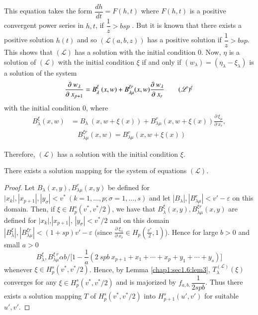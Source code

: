 This equation takes the form $\dfrac{dh}{dt} = F(h, t)$ where $F(h,
t)$ is a positive convergent power series in $h, t$,  if $\dfrac{1}{z}
> bsp$ . But it is known that there exists a positive solution $h(t)$
and so $(\mathscr{L}(a, b, z))$ has a positive solution if
$\dfrac{1}{z} >bsp$. This shows that $(\mathscr{L})$ has a solution
with the initial condition $0$. Now,  $\eta$ is a solution of
$(\mathscr{L})$ with the initial condition $\xi$ if and only if
$(w_\lambda) = (\eta_\lambda - \xi_\lambda )$ is a solution of the
system 
\begin{equation}
  \frac{\partial ~w_\lambda}{\partial ~ x_{p+1}} = B^\xi_\lambda ~ (x,
  w) + B^{\xi r}_{\lambda \mu} (x, w) \frac{\partial ~
    w_\lambda}{\partial ~ x_r} \tag*{$(\mathscr{L})^\xi$} 
\end{equation}\pageoriginale
with the initial condition $0$,  where
\begin{align*}
  B^\xi_\lambda (x, w) & =  B_\lambda ~ (x, w + \xi (x)) +
  B^r_{\lambda\mu} (x, w + \xi (x)) \frac{\partial ~ \xi_\mu}{\partial ~
    x_r}, \\ 
  & \quad  B^{\xi r}_{\lambda\mu} (x, w) = B^r_{\lambda\mu} (x, w + \xi (x))
\end{align*}

Therefore,  $(\mathscr{L})$ has a solution with the initial condition
$\xi$.  

\begin{lemma}\label{chap1:sec1.6:lem4}%
  There exists a solution mapping for the system of equations $(\mathscr{L})$.
\end{lemma}

\begin{proof}%
  Let $B_{\lambda} (x, y),  B^r_{\lambda\mu} (x, y)$  be defined for
  $| x_k |,  | x_{p+1} |,  | y_\sigma | < v^*  ~ (k = 1,  \ldots,  p;
  \sigma = 1,  \ldots,  s)$ and let $| B_\lambda |,  |
  B^r_{\lambda\mu} | < v' - \varepsilon$ on this domain. Then,  if
  $\xi \in H^s_p (v^*,  v^*/2)$,  we have that $B^\xi_\lambda (x, y),
  B^{\xi r}_{\lambda\mu} (x, y)$ are defined for $| x_k |$,\break $|x_{p+1}|$,
  $| y_\sigma | < v^* /2$ and on this domain $| B^\xi_\lambda |,  |
  B^{\xi r}_{\lambda \mu} | < (1 + sp) v' - \varepsilon$ (since
  $\frac{\partial ~ \xi_\lambda}{\partial ~ x_r } \in H_p
  (\frac{v^*}{2},  1)$). Hence for large $b > 0$ and small $a >0$ 
  $$
  B^\xi_\lambda,  B^{\xi ~ r}_{\lambda \mu} \alpha b\Big/ \Big[ 1 -
    \frac{1}{a} (2 ~ spb ~ x_{p+1} + x_1 +  \cdots + x_p + y_1 +
    \cdots + y_s)\Big] 
  $$
  whenever $\xi \in H^s_p (v^*,  v^* /2)$. Hence,  by
  Lemma \ref{chap1:sec1.6:lem3},
  $T_\lambda^{(\mathscr{L})} (\xi)$ converges for any $\xi \in H^s_p
  (v^*, v^*/2)$ and is majorized by $f_{a, b, } \dfrac{1}{2spb}$. Thus
  there exists a solution mapping $T$ of $H^s_p(v^*, v^*/2)$ into
  $H^s_{p+1}(u', v')$ for suitable $u', v'$. 
\end{proof}

